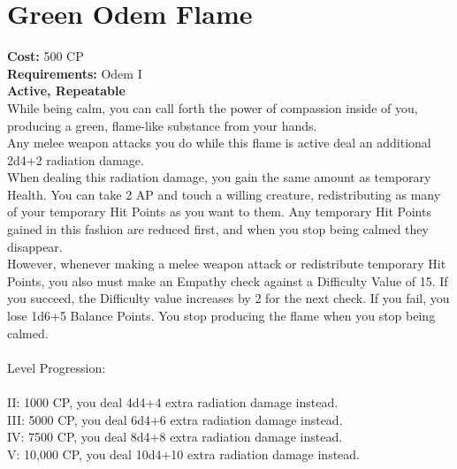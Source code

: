 \section{Green Odem Flame}
\textbf{Cost:} 500 CP\\
\textbf{Requirements:} Odem I\\
\textbf{Active, Repeatable}\\
While being calm, you can call forth the power of compassion inside of you, producing a green, flame-like substance from your hands.\\
Any melee weapon attacks you do while this flame is active deal an additional 2d4+2 radiation damage.\\
When dealing this radiation damage, you gain the same amount as temporary Health. You can take 2 AP and touch a willing creature, redistributing as many of your temporary Hit Points as you want to them. Any temporary Hit Points gained in this fashion are reduced first, and when you stop being calmed they disappear.\\
However, whenever making a melee weapon attack or redistribute temporary Hit Points, you also must make an Empathy check against a Difficulty Value of 15. If you succeed, the Difficulty value increases by 2 for the next check. If you fail, you lose 1d6+5 Balance Points. You stop producing the flame when you stop being calmed.\\ 
\\
Level Progression:\\
\\
II: 1000 CP, you deal 4d4+4 extra radiation damage instead.\\
III: 5000 CP, you deal 6d4+6 extra radiation damage instead.\\
IV: 7500 CP, you deal 8d4+8 extra radiation damage instead.\\
V: 10,000 CP, you deal 10d4+10 extra radiation damage instead.\\